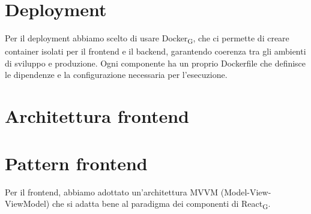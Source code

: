 \documentclass[11pt,a4paper]{article}
\newcommand{\gls}[1]{#1\textsubscript{G}}
\begin{document}
\section{Deployment}
Per il deployment abbiamo scelto di usare \gls{Docker}, che ci permette di creare container isolati per il frontend e il backend, 
garantendo coerenza tra gli ambienti di sviluppo e produzione. Ogni componente ha un proprio Dockerfile che definisce 
le dipendenze e la configurazione necessaria per l'esecuzione. \\

\section{Architettura frontend}
\section{Pattern frontend}
Per il frontend, abbiamo adottato un'architettura MVVM (Model-View-ViewModel) che si adatta bene al paradigma dei componenti di \gls{React}.

\subsection{}
\end{document}
